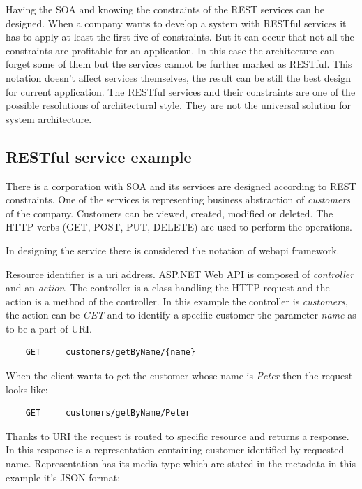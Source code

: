 Having the SOA and knowing the constraints of the REST services can be designed. When a company wants to develop a system with RESTful services it has to apply at least the first five of constraints. But it can occur that not all the constraints are profitable for an application. In this case the architecture can forget some of them but the services cannot be further marked as RESTful. This notation doesn't affect services themselves, the result can be still the best design for current application. The RESTful services and their constraints are one of the possible resolutions of architectural style. They are not the universal solution for system architecture.

\subsection{RESTful service example}
There is a corporation with SOA and its services are designed according to REST constraints. One of the services is representing business abstraction of \emph{customers} of the company. Customers can be viewed, created, modified or deleted. The HTTP verbs (GET, POST, PUT, DELETE) are used to perform the operations. 

In designing the service there is considered the notation of \gls{webapi} \gls{framework}. 

Resource identifier is a \gls{uri} address. ASP.NET Web API is composed of \emph{controller} and an \emph{action}. The controller is a class handling the HTTP request and the action is a method of the controller. In this example the controller is \emph{customers}, the action can be \emph{GET} and to identify a specific customer the parameter \emph{name} as to be a part of URI.

\begin{lstlisting}
    GET     customers/getByName/{name} 
\end{lstlisting}

When the client wants to get the customer whose name is \emph{Peter} then the request looks like:

\begin{lstlisting}
    GET     customers/getByName/Peter 
\end{lstlisting}

Thanks to URI the request is routed to specific resource and returns a response. In this response is a representation containing customer identified by requested name. Representation has its media type which are stated in the metadata in this  example it's JSON format:

